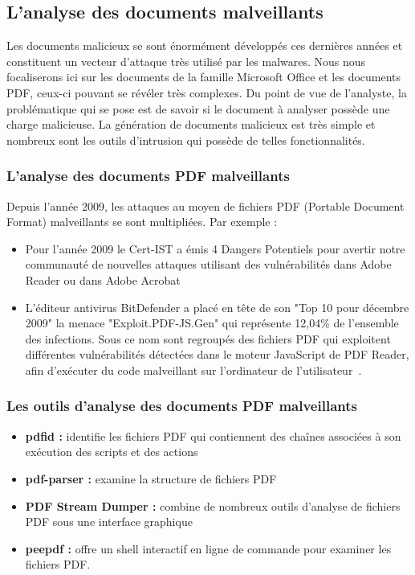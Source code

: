 \subsection{L'analyse des documents malveillants}
Les documents malicieux se sont énormément développés ces dernières années et constituent un vecteur d'attaque très utilisé par les malwares. Nous nous focaliserons ici sur les documents de la famille Microsoft Office et les documents PDF, ceux-ci pouvant se révéler très complexes. Du point de vue de l'analyste, la problématique qui se pose est de savoir si le document à analyser possède une charge malicieuse. La génération de documents malicieux est très simple et nombreux sont les outils d'intrusion qui possède de telles fonctionnalités.
\subsubsection{L'analyse des documents PDF malveillants}

Depuis l'année 2009, les attaques au moyen de fichiers PDF (Portable Document Format) malveillants se sont multipliées. Par exemple :\\

\begin{itemize}


\item Pour l'année 2009 le Cert-IST a émis 4 Dangers Potentiels pour avertir notre communauté de nouvelles attaques utilisant des vulnérabilités dans Adobe Reader ou dans Adobe Acrobat
\item L'éditeur antivirus BitDefender a placé en tête de son "Top 10 pour décembre 2009" la menace "Exploit.PDF-JS.Gen" qui représente 12,04\% de l'ensemble des infections. Sous ce nom sont regroupés des fichiers PDF qui exploitent différentes vulnérabilités détectées dans le moteur JavaScript de PDF Reader, afin d'exécuter du code malveillant sur l'ordinateur de l'utilisateur~\cite{PDF}.
\end{itemize}
\subsubsection*{Les outils d'analyse des documents PDF malveillants}
\begin{itemize}
\item \textbf{pdfid : }identifie les fichiers PDF qui contiennent des chaînes associées à son exécution des scripts et des actions
\item \textbf{pdf-parser : }examine la structure de fichiers PDF
\item \textbf{PDF Stream Dumper : }combine de nombreux outils d'analyse de fichiers PDF sous une interface graphique
\item \textbf{peepdf : }
offre un shell interactif en ligne de commande pour examiner les fichiers PDF.
\end{itemize}
